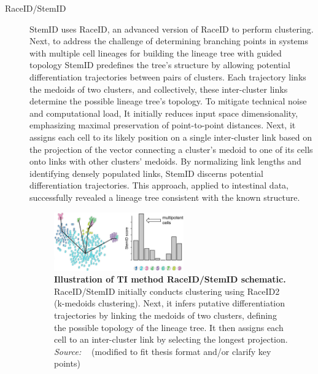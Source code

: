 \begin{description}
    \item[RaceID/StemID]
    StemID\citep{grun2016stemid} uses RaceID\citep{grun2015raceid}, an advanced version of RaceID to perform clustering. Next, to address the challenge of determining branching points in systems with multiple cell lineages for building the lineage tree with guided topology StemID predefines the tree's structure by allowing potential differentiation trajectories between pairs of clusters. Each trajectory links the medoids of two clusters, and collectively, these inter-cluster links determine the possible lineage tree's topology. To mitigate technical noise and computational load, It initially reduces input space dimensionality, emphasizing maximal preservation of point-to-point distances. Next, it assigns each cell to its likely position on a single inter-cluster link based on the projection of the vector connecting a cluster's medoid to one of its cells onto links with other clusters' medoids. By normalizing link lengths and identifying densely populated links, StemID discerns potential differentiation trajectories. This approach, applied to intestinal data, successfully revealed a lineage tree consistent with the known structure.
    \begin{figure}[ht!]
    	\centering
    	\includegraphics[width=0.55\textwidth]{TI_Alg_StemID/fig}
    	\vspace{0.1cm}
    	\caption[Illustration of TI method RaceID/StemID schematic.]{\textbf{Illustration of TI method RaceID/StemID schematic.} 
    	RaceID/StemID initially conducts clustering using RaceID2 (k-medoids clustering). Next, it infers putative differentiation trajectories by linking the medoids of two clusters, defining the possible topology of the lineage tree. It then assigns each cell to an inter-cluster link by selecting the longest projection. \emph{Source: ~\cite{albergante2020ElPiGraph}} (modified to fit thesis format and/or clarify key points)
    	}
    	\label{fig:TI_Alg_StemID}
    \end{figure}



\end{description}
